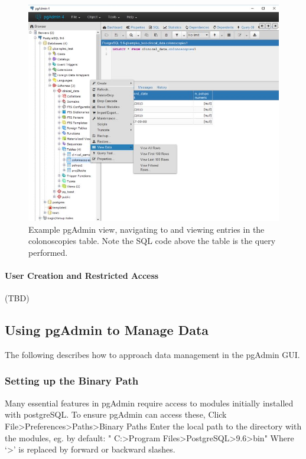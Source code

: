 \documentclass[]{article}
\let\oldparagraph\paragraph
\renewcommand{\paragraph}[1]{\oldparagraph{#1}\mbox{}}
\begin{document}
\begin{figure}[htbp]
\centering
\includegraphics{pgadmin_scn.jpg}
\caption{Example pgAdmin view, navigating to and viewing entries in the
colonoscopies table. Note the SQL code above the table is the query
performed.}
\end{figure}

\paragraph{User Creation and Restricted
Access}\label{user-creation-and-restricted-access}

(TBD)

\subsection{Using pgAdmin to Manage
Data}\label{using-pgadmin-to-manage-data}

The following describes how to approach data management in the pgAdmin
GUI.

\subsubsection{Setting up the Binary
Path}\label{setting-up-the-binary-path}

Many essential features in pgAdmin require access to modules initially
installed with postgreSQL. To ensure pgAdmin can access these, Click
File\textgreater{}Preferences\textgreater{}Paths\textgreater{}Binary
Paths Enter the local path to the directory with the modules, eg. by
default: " C:\textgreater{}Program
Files\textgreater{}PostgreSQL\textgreater{}9.6\textgreater{}bin" Where
`\textgreater{}' is replaced by forward or backward slashes.
\end{document}
